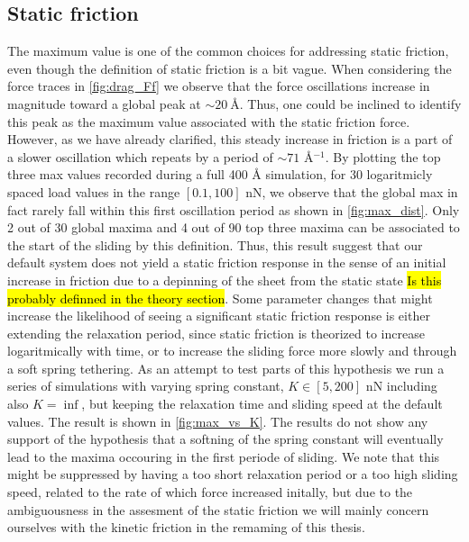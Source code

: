 \subsection{Static friction} 
The maximum value is one of the common choices for addressing static friction,
even though the definition of static friction is a bit vague. When considering
the force traces in \cref{fig:drag_Ff} we observe that the force oscillations
increase in magnitude toward a global peak at $\sim \SI{20}{\text{Å}}$. Thus,
one could be inclined to identify this peak as the maximum value associated with
the static friction force. However, as we have already clarified, this steady
increase in friction is a part of a slower oscillation which repeats by a period
of $\sim 71$ Å$^{-1}$. By plotting the top three max values recorded during a
full 400 Å simulation, for 30 logaritmicly spaced load values in the range
$[0.1, 100]$ nN, we observe that the global max in fact rarely fall within this
first oscillation period as shown in \cref{fig:max_dist}. Only 2 out of 30 global
maxima and 4 out of 90 top three maxima can be associated to the start of the sliding
by this definition. Thus, this result suggest that our default system does not
yield a static friction response in the sense of an initial increase in friction
due to a depinning of the sheet from the static state \hl{Is this probably
definned in the theory section}. Some parameter changes that might increase the
likelihood of seeing a significant static friction response is either extending
the relaxation period, since static friction is theorized to increase logaritmically
with time, or to increase the sliding force more slowly and through a soft spring tethering. As an attempt to test parts of this hypothesis we run a series of simulations with varying spring constant, $K\in [5, 200]$ nN including also $K = \inf$, but keeping the relaxation time and sliding speed at the default values. The result is shown in \cref{fig:max_vs_K}. The results do not show any support of the hypothesis that a softning of the spring constant will eventually lead to the maxima occouring in the first periode of sliding. We note that this might be suppressed by having a too short relaxation period or a too high sliding speed, related to the rate of which force increased initally, but due to the ambiguousness in the assesment of the static friction we will mainly concern ourselves with the kinetic friction in the remaming of this thesis.






